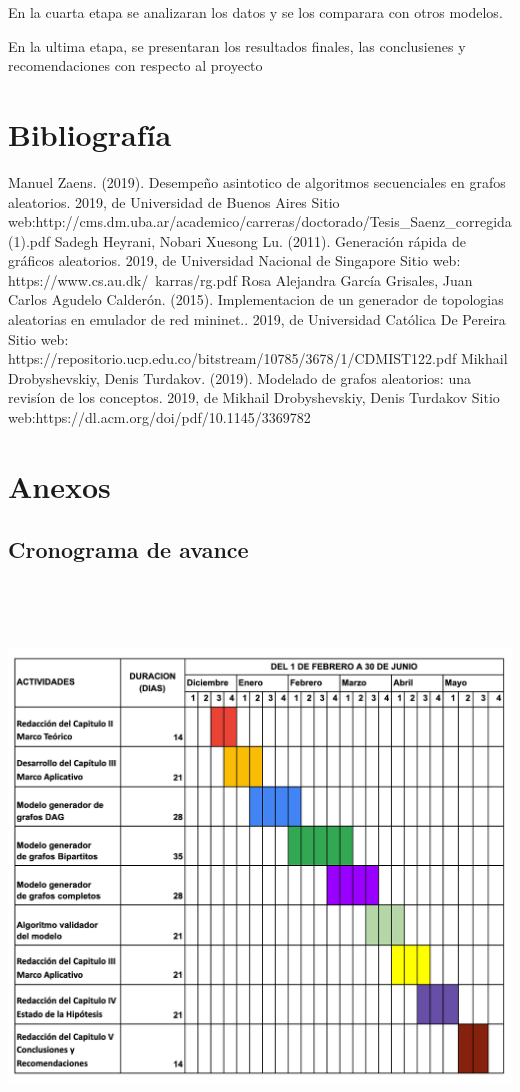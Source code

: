 \documentclass[11pt]{extarticle}
\begin{document}
    En la cuarta etapa se analizaran los datos y se los comparara con 
    otros modelos.
    \hfill\break

    En la ultima etapa, se presentaran los resultados finales, las
    conclusienes y recomendaciones con respecto al proyecto

\section{Bibliograf\'ia}
  Manuel Zaens. (2019). Desempeño asintotico de algoritmos secuenciales en grafos aleatorios. 2019, de Universidad de Buenos Aires Sitio web:\hfill\break http://cms.dm.uba.ar/academico/carreras/doctorado/Tesis\_Saenz\_corregida(1).pdf \hfill \break
  \break
  Sadegh Heyrani, Nobari Xuesong Lu. (2011). Generaci\'on r\'apida de gr\'aficos aleatorios. 2019, de Universidad Nacional de Singapore Sitio web: https://www.cs.au.dk/~karras/rg.pdf
  \break
  \break
  Rosa Alejandra Garc\'ia Grisales, Juan Carlos Agudelo Calder\'on. (2015). Implementacion de un generador de topologias aleatorias en emulador de red mininet.. 2019, de Universidad Cat\'olica De Pereira Sitio web: https://repositorio.ucp.edu.co/bitstream/10785/3678/1/CDMIST122.pdf
  \break
  \break
  Mikhail Drobyshevskiy, Denis Turdakov. (2019). Modelado de grafos aleatorios: una revis\'ion de los conceptos. 2019, de Mikhail Drobyshevskiy, Denis Turdakov Sitio web:\hfill\break https://dl.acm.org/doi/pdf/10.1145/3369782
\section{Anexos}
\subsection{Cronograma de avance}
\includegraphics[width=18cm,height=15cm]{calendario.png}
\end{document}
